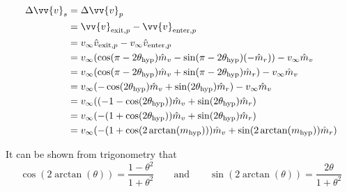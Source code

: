 \documentclass{article}
\begin{document}
\begin{align*}
    \Delta\vv{v}_s & = \Delta\vv{v}_p                                                                                             \\
                   & = \vv{v}_{\text{exit},p}-\vv{v}_{\text{enter},p}                                                             \\
                   & = v_\infty\hat{v}_{\text{exit},p}-v_\infty\hat{v}_{\text{enter},p}                                           \\
                   & = v_\infty(\cos(\pi-2\theta_\text{hyp})\hat{m}_v-\sin(\pi-2\theta_\text{hyp})(-\hat{m}_r))-v_\infty\hat{m}_v \\
                   & = v_\infty(\cos(\pi-2\theta_\text{hyp})\hat{m}_v+\sin(\pi-2\theta_\text{hyp})\hat{m}_r)-v_\infty\hat{m}_v    \\
                   & = v_\infty(-\cos(2\theta_\text{hyp})\hat{m}_v+\sin(2\theta_\text{hyp})\hat{m}_r)-v_\infty\hat{m}_v           \\
                   & = v_\infty((-1-\cos(2\theta_\text{hyp}))\hat{m}_v+\sin(2\theta_\text{hyp})\hat{m}_r)                         \\
                   & = v_\infty(-(1+\cos(2\theta_\text{hyp}))\hat{m}_v+\sin(2\theta_\text{hyp})\hat{m}_r)                         \\
                   & = v_\infty(-(1+\cos(2\arctan(m_\text{hyp})))\hat{m}_v+\sin(2\arctan(m_\text{hyp}))\hat{m}_r)                 \\
\end{align*}

It can be shown from trigonometry that
$$\cos(2\arctan(\theta))=\frac{1-\theta^2}{1+\theta^2}\qquad\text{and}\qquad\sin(2\arctan(\theta))=\frac{2\theta}{1+\theta^2}$$

\end{document}
